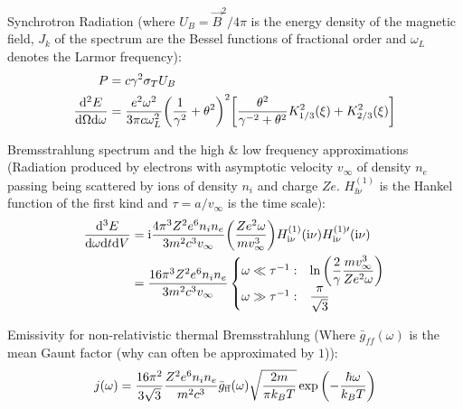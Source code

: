 		\noindent
		Synchrotron Radiation (where $U_B=\vec{B}^2/4\pi$ is the energy density of the magnetic field, $J_k$ of the spectrum are the Bessel functions of fractional order and $\omega_L$ denotes the Larmor frequency):
		\begin{equation}
			\begin{aligned}
				P &= c \gamma^2 \sigma_T U_B \\
				\frac{\dd^2 E}{\dd\Omega\dd\omega} &= \frac{e^2 \omega^2}{3\pi c\omega_L^2} \qty(\frac{1}{\gamma^2} + \theta^2)^2\qty[\frac{\theta^2}{\gamma^{-2}+\theta^2} K_{1/3}^2(\xi) + K_{2/3}^2(\xi)]\\ 
			\end{aligned}
		\end{equation}

		\noindent
		Bremsstrahlung spectrum and the high \& low frequency approximations (Radiation produced by electrons with asymptotic velocity $v_\infty$ of density $n_e$ passing being scattered by ions of density $n_i$ and charge $Ze$. $H_{\ii \nu}^{(1)}$ is the Hankel function of the first kind and $\tau=a / v_\infty$ is the time scale):
		\begin{equation}
			\begin{aligned}
				\frac{\dd^3 E}{\dd \omega \dd t \dd V} &= \mathrm{i} \frac{4\pi^3 Z^2 e^6 n_i n_e}{3m^2 c^3 v_\infty}\qty(\frac{Z e^2 \omega}{m v_\infty^3}) H_{\mathrm{i} \nu}^{(1)}(\mathrm{i}\nu) H_{\mathrm{i} \nu}^{(1)\prime}(\mathrm{i}\nu) \\
				&= \frac{16\pi^3 Z^2 e^6 n_i n_e}{3m^2 c^3 v_\infty}
				\begin{cases}
					\omega \ll \tau^{-1}: & \ln\qty(\dfrac{2}{\gamma}\dfrac{m v_{\infty}^3}{Z e^2 \omega}) \\
					\omega \gg \tau^{-1}: & \dfrac{\pi}{\sqrt{3}} \\
				\end{cases}\\
			\end{aligned}
		\end{equation}

		\noindent
		Emissivity for non-relativistic thermal Bremsstrahlung (Where $\bar{g}_{ff}(\omega)$ is the mean Gaunt factor (why can often be approximated by $1$)):
		\begin{equation}
			j(\omega) = \frac{16\pi^2}{3\sqrt{3}} \frac{Z^2 e^6 n_i n_e}{m^2 c^3} \bar{g}_{\text{ff}}(\omega) \sqrt{\frac{2m}{\pi k_B T}} \exp\qty(-\frac{\hbar \omega}{k_B T})
		\end{equation}

